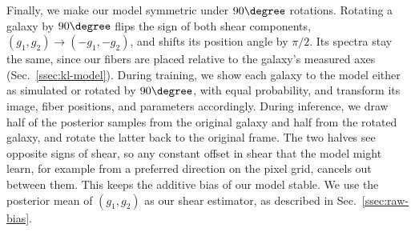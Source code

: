 Finally, we make our model symmetric under $90\degree$ rotations. Rotating a galaxy by $90\degree$ flips the sign of both shear components, $(g_1, g_2) \rightarrow (-g_1, -g_2)$, and shifts its position angle by $\pi/2$. Its spectra stay the same, since our fibers are placed relative to the galaxy's measured axes (Sec.~\ref{ssec:kl-model}). During training, we show each galaxy to the model either as simulated or rotated by $90\degree$, with equal probability, and transform its image, fiber positions, and parameters accordingly. During inference, we draw half of the posterior samples from the original galaxy and half from the rotated galaxy, and rotate the latter back to the original frame. The two halves see opposite signs of shear, so any constant offset in shear that the model might learn, for example from a preferred direction on the pixel grid, cancels out between them. This keeps the additive bias of our model stable. We use the posterior mean of $(g_1, g_2)$ as our shear estimator, as described in Sec.~\ref{ssec:raw-bias}.

